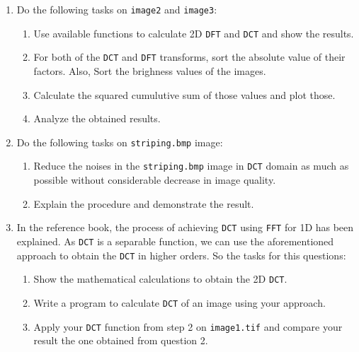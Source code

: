 \documentclass[11pt]{article}
\providecommand{\tightlist}{%
      \setlength{\itemsep}{0pt}\setlength{\parskip}{0pt}}
\begin{document}
\begin{enumerate}
\def\labelenumi{\arabic{enumi}.}
\setcounter{enumi}{1}
\tightlist
\item
  Do the following tasks on \texttt{image2} and \texttt{image3}:

  \begin{enumerate}
  \def\labelenumii{\arabic{enumii}.}
  \tightlist
  \item
    Use available functions to calculate 2D \texttt{DFT} and
    \texttt{DCT} and show the results.
  \item
    For both of the \texttt{DCT} and \texttt{DFT} transforms, sort the
    absolute value of their factors. Also, Sort the brighness values of
    the images.
  \item
    Calculate the squared cumulutive sum of those values and plot those.
  \item
    Analyze the obtained results.
  \end{enumerate}
\item
  Do the following tasks on \texttt{striping.bmp} image:

  \begin{enumerate}
  \def\labelenumii{\arabic{enumii}.}
  \tightlist
  \item
    Reduce the noises in the \texttt{striping.bmp} image in \texttt{DCT}
    domain as much as possible without considerable decrease in image
    quality.
  \item
    Explain the procedure and demonstrate the result.
  \end{enumerate}
\item
  In the reference book, the process of achieving \texttt{DCT} using
  \texttt{FFT} for 1D has been explained. As \texttt{DCT} is a separable
  function, we can use the aforementioned approach to obtain the
  \texttt{DCT} in higher orders. So the tasks for this questions:

  \begin{enumerate}
  \def\labelenumii{\arabic{enumii}.}
  \tightlist
  \item
    Show the mathematical calculations to obtain the 2D \texttt{DCT}.
  \item
    Write a program to calculate \texttt{DCT} of an image using your
    approach.
  \item
    Apply your \texttt{DCT} function from step 2 on \texttt{image1.tif}
    and compare your result the one obtained from question 2.
  \end{enumerate}
\end{enumerate}
\end{document}
